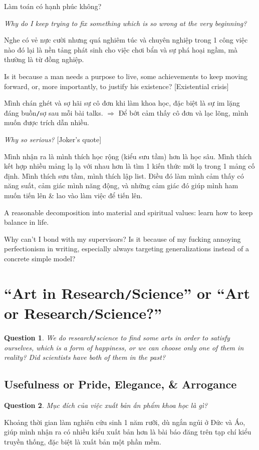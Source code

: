 \documentclass{article}
\numberwithin{equation}{section}
\newtheorem{question}{Question}[section]
\begin{document}
Làm toán có hạnh phúc không?

\textit{Why do I keep trying to fix something which is so wrong at the very beginning?}

Nghe có vẻ nực cười nhưng quá nghiêm túc và chuyên nghiệp trong 1 công việc nào đó lại là nền tảng phát sinh cho việc chơi bẩn và sự phá hoại ngầm, mà thường là từ đồng nghiệp.

Is it because a man needs a purpose to live, some achievements to keep moving forward, or, more importantly, to justify his existence? [Existential crisis]

Mình chán ghét và sợ hãi sự cô đơn khi làm khoa học, đặc biệt là sự im lặng đáng buồn\texttt{/}sợ sau mỗi bài talks. $\Rightarrow$ Để bớt cảm thấy cô đơn và lạc lõng, mình muốn được trích dẫn nhiều.

\textit{Why so serious?} [Joker's quote]

Mình nhận ra là mình thích học rộng (kiểu sưu tầm) hơn là học sâu. Mình thích kết hợp nhiều mảng lạ lạ với nhau hơn là tìm 1 kiến thức mới lạ trong 1 mảng cố định. Mình thích sưu tầm, mình thích lập list. Điều đó làm mình cảm thấy có năng suất, cảm giác mình năng động, và những cảm giác đó giúp mình ham muốn tiến lên \& lao vào làm việc để tiến lên.

A reasonable decomposition into material and spiritual values: learn how to keep balance in life.

Why can't I bond with my supervisors? Is it because of my fucking annoying perfectionism in writing, especially always targeting generalizations instead of a concrete simple model?

\section{``Art in Research\texttt{/}Science'' or ``Art or Research\texttt{/}Science?''}
\begin{question}
	We do research\texttt{/}science to find some arts in order to satisfy ourselves, which is a form of happiness, or we can choose only one of them in reality? Did scientists have both of them in the past?
\end{question}

\subsection{Usefulness or Pride, Elegance, \& Arrogance}
\begin{question}
	Mục đích của việc xuất bản ấn phẩm khoa học là gì?
\end{question}
Khoảng thời gian làm nghiên cứu sinh 1 năm rưỡi, dù ngắn ngủi ở Đức và Áo, giúp mình nhận ra có nhiều kiểu xuất bản hơn là bài báo đăng trên tạp chí kiểu truyền thống, đặc biệt là xuất bản một phần mềm.
\end{document}

